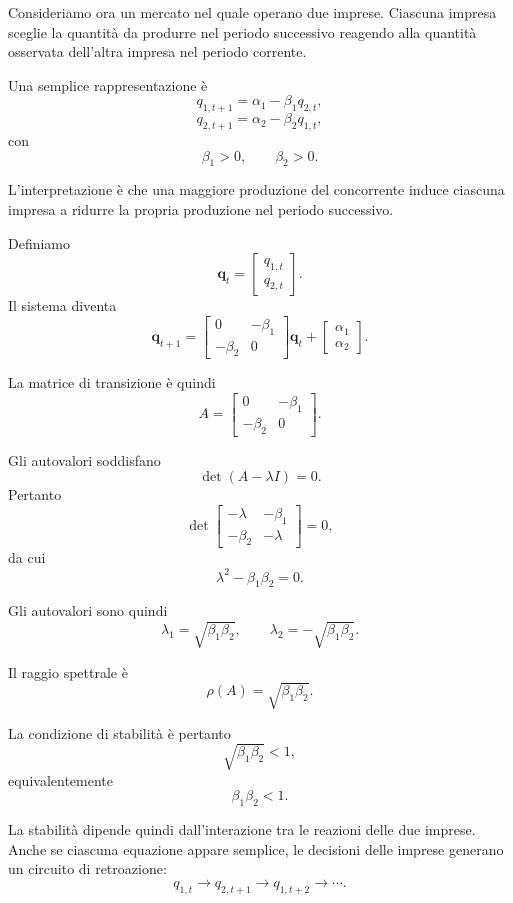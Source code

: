 \documentclass{book}
\begin{document}
Consideriamo ora un mercato nel quale operano due imprese. Ciascuna impresa
sceglie la quantità da produrre nel periodo successivo reagendo alla
quantità osservata dell'altra impresa nel periodo corrente.

Una semplice rappresentazione è
\[
q_{1,t+1}
=
\alpha_1-\beta_1 q_{2,t},
\]
\[
q_{2,t+1}
=
\alpha_2-\beta_2 q_{1,t},
\]
con
\[
\beta_1>0,
\qquad
\beta_2>0.
\]

L'interpretazione è che una maggiore produzione del concorrente induce
ciascuna impresa a ridurre la propria produzione nel periodo successivo.

Definiamo
\[
\mathbf{q}_t=
\begin{bmatrix}
q_{1,t}\\
q_{2,t}
\end{bmatrix}.
\]
Il sistema diventa
\[
\mathbf{q}_{t+1}
=
\begin{bmatrix}
0&-\beta_1\\
-\beta_2&0
\end{bmatrix}
\mathbf{q}_t
+
\begin{bmatrix}
\alpha_1\\
\alpha_2
\end{bmatrix}.
\]

La matrice di transizione è quindi
\[
A=
\begin{bmatrix}
0&-\beta_1\\
-\beta_2&0
\end{bmatrix}.
\]

Gli autovalori soddisfano
\[
\det(A-\lambda I)=0.
\]
Pertanto
\[
\det
\begin{bmatrix}
-\lambda&-\beta_1\\
-\beta_2&-\lambda
\end{bmatrix}
=0,
\]
da cui
\[
\lambda^2-\beta_1\beta_2=0.
\]

Gli autovalori sono quindi
\[
\lambda_1=\sqrt{\beta_1\beta_2},
\qquad
\lambda_2=-\sqrt{\beta_1\beta_2}.
\]

Il raggio spettrale è
\[
\rho(A)=\sqrt{\beta_1\beta_2}.
\]

La condizione di stabilità è pertanto
\[
\sqrt{\beta_1\beta_2}<1,
\]
equivalentemente
\[
\beta_1\beta_2<1.
\]

La stabilità dipende quindi dall'interazione tra le reazioni delle due
imprese. Anche se ciascuna equazione appare semplice, le decisioni delle
imprese generano un circuito di retroazione:
\[
q_{1,t}
\longrightarrow
q_{2,t+1}
\longrightarrow
q_{1,t+2}
\longrightarrow\cdots.
\]
\end{document}

